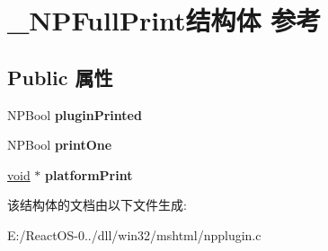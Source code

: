 \hypertarget{struct___n_p_full_print}{}\section{\+\_\+\+N\+P\+Full\+Print结构体 参考}
\label{struct___n_p_full_print}
\subsection*{Public 属性}
\begin{DoxyCompactItemize}
\item 
\mbox{\label{struct___n_p_full_print_a3ca77a50210f8e9e8232992b3ab7682e}} 
N\+P\+Bool {\bfseries plugin\+Printed}
\item 
\mbox{\label{struct___n_p_full_print_a809c29777645db1a739e48a30803c1f1}} 
N\+P\+Bool {\bfseries print\+One}
\item 
\mbox{\label{struct___n_p_full_print_a747b4c22896b774a1746715dce29c609}} 
\hyperlink{interfacevoid}{void} $\ast$ {\bfseries platform\+Print}
\end{DoxyCompactItemize}


该结构体的文档由以下文件生成\+:\begin{DoxyCompactItemize}
\item 
E\+:/\+React\+O\+S-\/0../dll/win32/mshtml/npplugin.\+c\end{DoxyCompactItemize}
